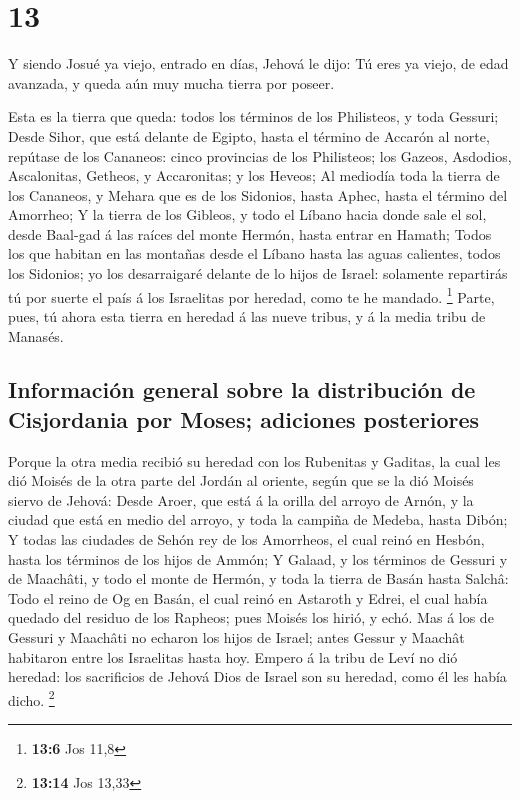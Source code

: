 \hypertarget{section-12}{%
\section{13}\label{section-12}}

 Y siendo Josué ya viejo, entrado en días, Jehová le dijo:
Tú eres ya viejo, de edad avanzada, y queda aún muy mucha tierra por
poseer.

 Esta es la tierra que queda: todos los términos de los
Philisteos, y toda Gessuri;  Desde Sihor, que está delante
de Egipto, hasta el término de Accarón al norte, repútase de los
Cananeos: cinco provincias de los Philisteos; los Gazeos, Asdodios,
Ascalonitas, Getheos, y Accaronitas; y los Heveos;  Al
mediodía toda la tierra de los Cananeos, y Mehara que es de los
Sidonios, hasta Aphec, hasta el término del Amorrheo;  Y la
tierra de los Gibleos, y todo el Líbano hacia donde sale el sol, desde
Baal-gad á las raíces del monte Hermón, hasta entrar en Hamath;
 Todos los que habitan en las montañas desde el Líbano hasta
las aguas calientes, todos los Sidonios; yo los desarraigaré delante de
lo hijos de Israel: solamente repartirás tú por suerte el país á los
Israelitas por heredad, como te he mandado. \footnote{\textbf{13:6} Jos
  11,8}  Parte, pues, tú ahora esta tierra en heredad á las
nueve tribus, y á la media tribu de Manasés.

\hypertarget{informaciuxf3n-general-sobre-la-distribuciuxf3n-de-cisjordania-por-moses-adiciones-posteriores}{%
\subsection{Información general sobre la distribución de Cisjordania por
Moses; adiciones
posteriores}\label{informaciuxf3n-general-sobre-la-distribuciuxf3n-de-cisjordania-por-moses-adiciones-posteriores}}

 Porque la otra media recibió su heredad con los Rubenitas y
Gaditas, la cual les dió Moisés de la otra parte del Jordán al oriente,
según que se la dió Moisés siervo de Jehová:  Desde Aroer,
que está á la orilla del arroyo de Arnón, y la ciudad que está en medio
del arroyo, y toda la campiña de Medeba, hasta Dibón;  Y
todas las ciudades de Sehón rey de los Amorrheos, el cual reinó en
Hesbón, hasta los términos de los hijos de Ammón;  Y
Galaad, y los términos de Gessuri y de Maachâti, y todo el monte de
Hermón, y toda la tierra de Basán hasta Salchâ:  Todo el
reino de Og en Basán, el cual reinó en Astaroth y Edrei, el cual había
quedado del residuo de los Rapheos; pues Moisés los hirió, y echó.
 Mas á los de Gessuri y Maachâti no echaron los hijos de
Israel; antes Gessur y Maachât habitaron entre los Israelitas hasta hoy.
 Empero á la tribu de Leví no dió heredad: los sacrificios
de Jehová Dios de Israel son su heredad, como él les había dicho.
\footnote{\textbf{13:14} Jos 13,33}

